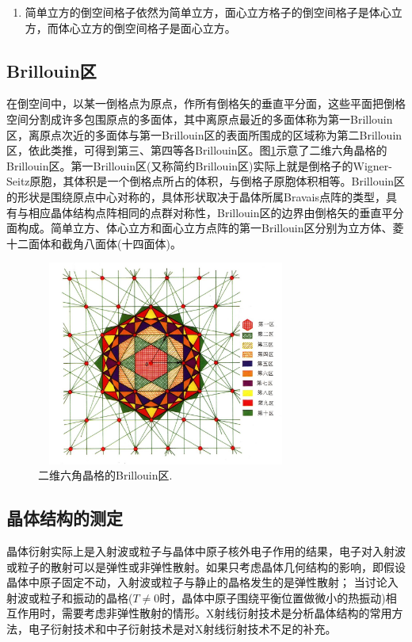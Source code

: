 \begin{enumerate}
\item 简单立方的倒空间格子依然为简单立方，面心立方格子的倒空间格子是体心立方，而体心立方的倒空间格子是面心立方。
\end{enumerate}

\subsection{Brillouin区} 
在倒空间中，以某一倒格点为原点，作所有倒格矢的垂直平分面，这些平面把倒格空间分割成许多包围原点的多面体，其中离原点最近的多面体称为第一Brillouin区，离原点次近的多面体与第一Brillouin区的表面所围成的区域称为第二Brillouin区，依此类推，可得到第三、第四等各Brillouin区。图\ref{Fig:Brillouin-2D}示意了二维六角晶格的Brillouin区。第一Brillouin区(又称简约Brillouin区)实际上就是倒格子的Wigner-Seitz原胞，其体积是一个倒格点所占的体积，与倒格子原胞体积相等。Brillouin区的形状是围绕原点中心对称的，具体形状取决于晶体所属Bravais点阵的类型，具有与相应晶体结构点阵相同的点群对称性，Brillouin区的边界由倒格矢的垂直平分面构成。简单立方、体心立方和面心立方点阵的第一Brillouin区分别为立方体、菱十二面体和截角八面体(十四面体)。
\begin{figure}[h!]
\centering
\vspace*{-0.05in}
\includegraphics[height=2.65in,width=3.35in,viewport=0 0 510 440,clip]{Figures/2D-Brillouin-Zone.jpg}
\caption{\small \textrm{二维六角晶格的Brillouin区.}}%
\label{Fig:Brillouin-2D}
\end{figure}

\subsection{晶体结构的测定} 
晶体衍射实际上是入射波或粒子与晶体中原子核外电子作用的结果，电子对入射波或粒子的散射可以是弹性或非弹性散射。如果只考虑晶体几何结构的影响，即假设晶体中原子固定不动，入射波或粒子与静止的晶格发生的是弹性散射；%
当讨论入射波或粒子和振动的晶格($T\neq0$时，晶体中原子围绕平衡位置做微小的热振动)相互作用时，需要考虑非弹性散射的情形。X射线衍射技术是分析晶体结构的常用方法，电子衍射技术和中子衍射技术是对X射线衍射技术不足的补充。

